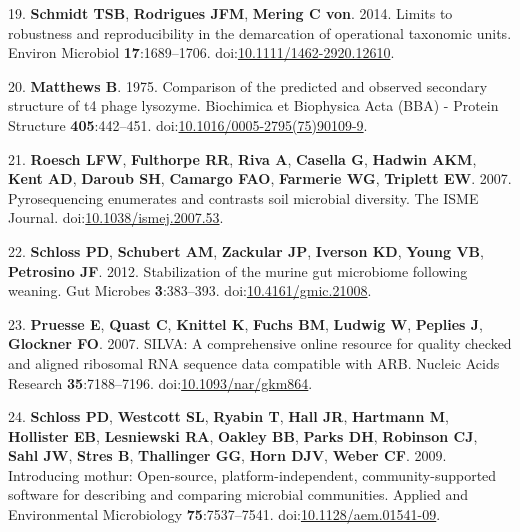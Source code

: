 \documentclass[11pt,]{article}
\begin{document}
\hypertarget{ref-Schmidt2014Limits}{}
19. \textbf{Schmidt TSB}, \textbf{Rodrigues JFM}, \textbf{Mering C von}.
2014. Limits to robustness and reproducibility in the demarcation of
operational taxonomic units. Environ Microbiol \textbf{17}:1689--1706.
doi:\href{https://doi.org/10.1111/1462-2920.12610}{10.1111/1462-2920.12610}.

\hypertarget{ref-Matthews1975}{}
20. \textbf{Matthews B}. 1975. Comparison of the predicted and observed
secondary structure of t4 phage lysozyme. Biochimica et Biophysica Acta
(BBA) - Protein Structure \textbf{405}:442--451.
doi:\href{https://doi.org/10.1016/0005-2795(75)90109-9}{10.1016/0005-2795(75)90109-9}.

\hypertarget{ref-Roesch2007}{}
21. \textbf{Roesch LFW}, \textbf{Fulthorpe RR}, \textbf{Riva A},
\textbf{Casella G}, \textbf{Hadwin AKM}, \textbf{Kent AD},
\textbf{Daroub SH}, \textbf{Camargo FAO}, \textbf{Farmerie WG},
\textbf{Triplett EW}. 2007. Pyrosequencing enumerates and contrasts soil
microbial diversity. The ISME Journal.
doi:\href{https://doi.org/10.1038/ismej.2007.53}{10.1038/ismej.2007.53}.

\hypertarget{ref-Schloss2012Stabilization}{}
22. \textbf{Schloss PD}, \textbf{Schubert AM}, \textbf{Zackular JP},
\textbf{Iverson KD}, \textbf{Young VB}, \textbf{Petrosino JF}. 2012.
Stabilization of the murine gut microbiome following weaning. Gut
Microbes \textbf{3}:383--393.
doi:\href{https://doi.org/10.4161/gmic.21008}{10.4161/gmic.21008}.

\hypertarget{ref-Pruesse2007}{}
23. \textbf{Pruesse E}, \textbf{Quast C}, \textbf{Knittel K},
\textbf{Fuchs BM}, \textbf{Ludwig W}, \textbf{Peplies J},
\textbf{Glockner FO}. 2007. SILVA: A comprehensive online resource for
quality checked and aligned ribosomal RNA sequence data compatible with
ARB. Nucleic Acids Research \textbf{35}:7188--7196.
doi:\href{https://doi.org/10.1093/nar/gkm864}{10.1093/nar/gkm864}.

\hypertarget{ref-Schloss2009}{}
24. \textbf{Schloss PD}, \textbf{Westcott SL}, \textbf{Ryabin T},
\textbf{Hall JR}, \textbf{Hartmann M}, \textbf{Hollister EB},
\textbf{Lesniewski RA}, \textbf{Oakley BB}, \textbf{Parks DH},
\textbf{Robinson CJ}, \textbf{Sahl JW}, \textbf{Stres B},
\textbf{Thallinger GG}, \textbf{Horn DJV}, \textbf{Weber CF}. 2009.
Introducing mothur: Open-source, platform-independent,
community-supported software for describing and comparing microbial
communities. Applied and Environmental Microbiology
\textbf{75}:7537--7541.
doi:\href{https://doi.org/10.1128/aem.01541-09}{10.1128/aem.01541-09}.
\end{document}
